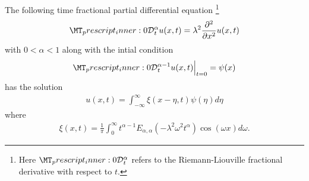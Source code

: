 \begin{mdframed}[innertopmargin=10pt]
\begin{proposition}
    \label{prop:nig_frac}
    The following time fractional partial differential equation \footnote{Here $ \prescript{}{0}{\mathcal{D}}^\alpha_t $ refers to the Riemann-Liouville fractional derivative with respect to $ t $.}
    \begin{align}
        \label{eq:nig_frac}
        \prescript{}{0}{\mathcal{D}}^\alpha_t u(x,t) = \lambda^2 \frac{\partial^2}{\partial x^2}u(x,t)
    \end{align}
    with $ 0 < \alpha < 1 $ along with the intial condition
    \begin{align*}
        \prescript{}{0}{\mathcal{D}}^{\alpha-1}_t u(x,t) \Big|_{t=0} = \psi(x)
    \end{align*}
    has the solution
    \begin{align*}
        u(x,t) = \int_{-\infty}^\infty \xi(x - \eta, t) \psi(\eta) d\eta
    \end{align*}
    where
    \begin{align*}
        \xi(x,t) = \frac{1}{\pi} \int_0^\infty t^{\alpha - 1} E_{\alpha, \alpha}(-\lambda^2\omega^2t^\alpha)\cos(\omega x)d\omega.
    \end{align*}
\end{proposition}
\end{mdframed}
